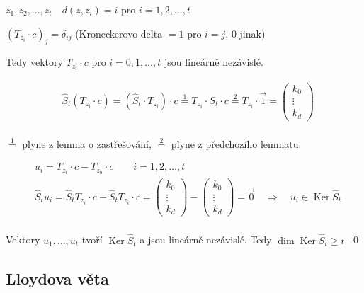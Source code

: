 \documentclass[a4paper,12pt,titlepage]{article}
\DeclareMathOperator{\Ker}{Ker}
\begin{document}
$z_1,z_2,\dots,z_t \quad d(z,z_i) = i$ pro $i = 1,2,\dots,t$

$(T_{z_i} \cdot c)_j = \delta_{ij}$ (Kroneckerovo delta $= 1$ pro $i=j$, $0$ jinak)

Tedy vektory $T_{z_i} \cdot c$ pro $i = 0, 1, \dots, t$ jsou lineárně nezávislé.

\begin{align*}
	&\widehat S_t(T_{z_i}\cdot c) = (\widehat S_t \cdot T_{z_i}) \cdot c \overset{1}{=} T_{z_i} \cdot S_t \cdot c \overset{2}{=} T_{z_i}\cdot \vec 1 = \left(\begin{matrix}
		k_0 \\ \vdots \\ k_d
	\end{matrix}\right) \\
\end{align*}

$\overset{1}{=}$ plyne z lemma o zastřešování, $\overset{2}{=}$ plyne z předchozího lemmatu.

\begin{align*}
	&u_i = T_{z_i}\cdot c - T_{z_0}\cdot c\qquad i = 1, 2, \dots, t \\
	&\widehat S_t u_i = \widehat S_t T_{z_i}\cdot c - \widehat S_t T_{z_i}\cdot c = \left(\begin{matrix}k_0 \\ \vdots \\ k_d\end{matrix}\right) - \left(\begin{matrix}k_0 \\ \vdots \\ k_d\end{matrix}\right) = \vec 0 \quad\Rightarrow\quad u_i\in\Ker \widehat S_t\\
\end{align*}

Vektory $u_1,\dots, u_t$ tvoří $\Ker \widehat S_t$ a jsou lineárně nezávislé. Tedy $\dim\Ker\widehat S_t \ge t$.
\qed


\subsection{Lloydova věta}
\end{document}
